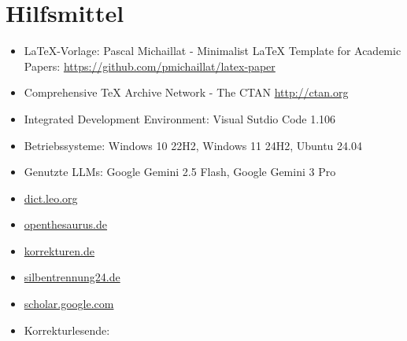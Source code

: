 \documentclass[letterpaper,11pt,leqno]{article}
\begin{document}
\clearpage
\section{Hilfsmittel}
\begin{itemize}
	\item LaTeX-Vorlage: Pascal Michaillat - Minimalist LaTeX Template for Academic Papers: \url{https://github.com/pmichaillat/latex-paper}
	\item Comprehensive TeX Archive Network - The CTAN \url{http://ctan.org}
	\item Integrated Development Environment: Visual Sutdio Code 1.106
	\item Betriebssysteme: Windows 10 22H2, Windows 11 24H2, Ubuntu 24.04
	\item Genutzte LLMs: Google Gemini 2.5 Flash, Google Gemini 3 Pro
	\item \url{dict.leo.org}
	\item \url{openthesaurus.de}
	\item \url{korrekturen.de}
	\item \url{silbentrennung24.de}
	\item \url{scholar.google.com}
	\item Korrekturlesende: 
\end{itemize}
\end{document}
